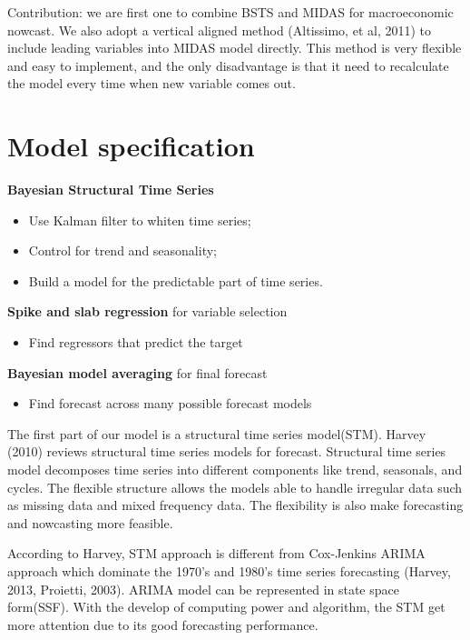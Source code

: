 Contribution:  we are first one to combine BSTS and MIDAS for macroeconomic nowcast. We also adopt a vertical aligned method \cite{Altissimo2010}  (Altissimo, et al, 2011) to include leading variables into MIDAS model directly. This method is very flexible and easy to implement, and the only disadvantage is that it need to recalculate the model every time when new variable comes out.


\section{Model specification}


\textbf{Bayesian Structural Time Series} 

\begin{itemize}
	\item {Use Kalman filter to whiten time series;}
	\item {Control for trend and seasonality;}
	\item {Build a model for the predictable part of time series.}
\end{itemize}



\noindent \textbf{Spike and slab regression} for variable selection 

\begin{itemize}
	\item {Find regressors that predict the target}
\end{itemize}

\noindent \textbf{Bayesian model averaging} for final forecast

\begin{itemize}
	\item {Find forecast across many possible forecast models}
\end{itemize}



The first part of our model is a structural time series model(STM). Harvey (2010) reviews  structural time series models for forecast. Structural time series model decomposes time series into different components like trend, seasonals, and cycles. The flexible structure allows the models able to handle irregular data such as missing data and mixed frequency data. The flexibility is also make forecasting and nowcasting more feasible.     

According to Harvey, STM approach is different from Cox-Jenkins ARIMA approach which dominate the 1970's and 1980's time series forecasting (Harvey, 2013, Proietti, 2003). ARIMA model can be represented in state space form(SSF). With the develop of computing power and algorithm, the STM get more attention due to its good forecasting performance.



